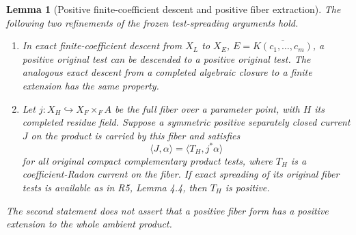 \documentclass[11pt,a4paper]{article}
\numberwithin{equation}{section}
\newtheorem{lemma}[theorem]{Lemma}
\theoremstyle{definition}
\theoremstyle{remark}
\begin{document}
\begin{lemma}[Positive finite-coefficient descent and positive fiber extraction]
\label{lem:r6-positive-descent-fiber-extraction}
The following two refinements of the frozen test-spreading arguments
hold.
\begin{enumerate}
\item In exact finite-coefficient descent from $X_L$ to
$X_E$, $E=\overline{K(c_1,\ldots,c_m)}$, a positive original
test can be descended to a positive original test. The analogous
exact descent from a completed algebraic closure to a finite
extension has the same property.
\item Let $j:X_H\hookrightarrow X_F\times_F A$ be the full
fiber over a parameter point, with $H$ its completed residue field.
Suppose a symmetric positive separately closed current $J$ on the
product is carried by this fiber and satisfies
\[
                    \langle J,\alpha\rangle
                          =\langle T_H,j^*\alpha\rangle
\]
for all original compact complementary product tests, where
$T_H$ is a coefficient-Radon current on the fiber. If exact
spreading of its original fiber tests is available as in R5,
Lemma 4.4, then $T_H$ is positive.
\end{enumerate}
The second statement does not assert that a positive fiber form
has a positive extension to the whole ambient product.
\end{lemma}
\end{document}
